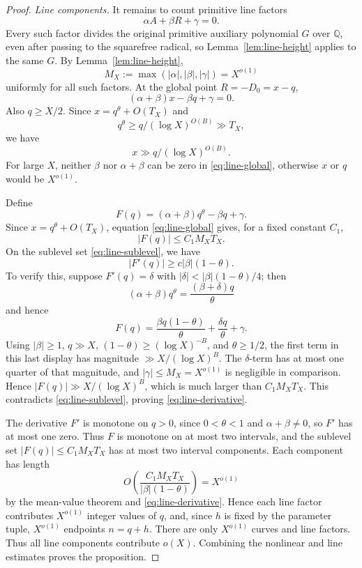 \documentclass[11pt]{article}
\theoremstyle{definition}
\newcommand{\Q}{\mathbb Q}
\newcommand{\1}{\mathbf 1}
\begin{document}
\begin{proof}
\smallskip
\noindent\emph{Line components.}
It remains to count primitive line factors
\[
  \alpha A+\beta R+\gamma=0.
\]
Every such factor divides the original primitive auxiliary polynomial \(G\)
over \(\Q\), even after passing to the squarefree radical, so
Lemma~\ref{lem:line-height} applies to the same \(G\).
By Lemma~\ref{lem:line-height},
\[
  M_X:=\max(|\alpha|,|\beta|,|\gamma|)=X^{o(1)}
\]
uniformly for all such factors.  At the global point \(R=-D_0=x-q\),
\[
  (\alpha+\beta)x-\beta q+\gamma=0.              \tag{1}\label{eq:line-global}
\]
Also \(q\ge X/2\).  Since \(x=q^\theta+O(T_X)\) and
\[
  q^\theta\ge q/(\log X)^{O(B)}\gg T_X,
\]
we have
\[
  x\gg q/(\log X)^{O(B)}.
\]
For large \(X\), neither \(\beta\) nor \(\alpha+\beta\) can be zero in
\eqref{eq:line-global}, otherwise \(x\) or \(q\) would be \(X^{o(1)}\).

Define
\[
  F(q)=(\alpha+\beta)q^\theta-\beta q+\gamma.
\]
Since \(x=q^\theta+O(T_X)\), equation \eqref{eq:line-global} gives, for a
fixed constant \(C_1\),
\[
  |F(q)|\le C_1M_XT_X.                           \tag{2}\label{eq:line-sublevel}
\]
On the sublevel set \eqref{eq:line-sublevel}, we have
\[
  |F'(q)|\ge c|\beta|(1-\theta).                 \tag{3}\label{eq:line-derivative}
\]
To verify this, suppose \(F'(q)=\delta\) with
\(|\delta|<|\beta|(1-\theta)/4\); then
\[
  (\alpha+\beta)q^\theta=\frac{(\beta+\delta)q}{\theta}
\]
and hence
\[
  F(q)=\frac{\beta q(1-\theta)}{\theta}
       +\frac{\delta q}{\theta}+\gamma.
\]
Using \(|\beta|\ge1\), \(q\gg X\),
\((1-\theta)\ge(\log X)^{-B}\), and \(\theta\ge1/2\), the first term in this
last display has magnitude \(\gg X/(\log X)^B\).  The \(\delta\)-term has at
most one quarter of that magnitude, and \(|\gamma|\le M_X=X^{o(1)}\) is
negligible in comparison.  Hence \(|F(q)|\gg X/(\log X)^B\), which is much
larger than \(C_1M_XT_X\).
This contradicts \eqref{eq:line-sublevel}, proving
\eqref{eq:line-derivative}.

The derivative \(F'\) is monotone on \(q>0\), since \(0<\theta<1\) and
\(\alpha+\beta\ne0\), so \(F'\) has at most one zero.  Thus \(F\) is monotone
on at most two intervals, and the sublevel set
\(|F(q)|\le C_1M_XT_X\) has at most two interval components.  Each component
has length
\[
  O\!\left(\frac{C_1M_XT_X}{|\beta|(1-\theta)}\right)=X^{o(1)}
\]
by the mean-value theorem and \eqref{eq:line-derivative}.  Hence each line
factor contributes \(X^{o(1)}\) integer values of \(q\), and, since \(h\) is
fixed by the parameter tuple, \(X^{o(1)}\) endpoints \(n=q+h\).  There are only
\(X^{o(1)}\) curves and line factors.  Thus all line components contribute
\(o(X)\).  Combining the nonlinear and line estimates proves the proposition.
\end{proof}
\end{document}
